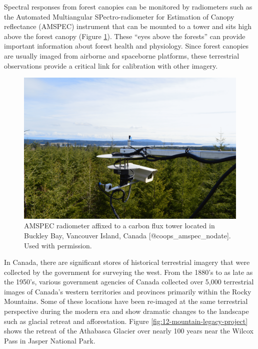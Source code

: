 \documentclass[
]{book}
\begin{document}
Spectral responses from forest canopies can be monitored by radiometers such as the Automated Multiangular SPectro-radiometer for Estimation of Canopy reflectance (AMSPEC) instrument that can be mounted to a tower and sits high above the forest canopy (Figure \ref{fig:12-flux-tower-radiometer}). These ``eyes above the forests'' can provide important information about forest health and physiology. Since forest canopies are usually imaged from airborne and spaceborne platforms, these terrestrial observations provide a critical link for calibration with other imagery.

\begin{figure}
\includegraphics[width=0.9\linewidth]{images/12-flux-tower-radiometer} \caption{AMSPEC radiometer affixed to a carbon flux tower located in Buckley Bay, Vancouver Island, Canada [@coops_amspec_nodate]. Used with permission.}\label{fig:12-flux-tower-radiometer}
\end{figure}

In Canada, there are significant stores of historical terrestrial imagery that were collected by the government for surveying the west. From the 1880's to as late as the 1950's, various government agencies of Canada collected over 5,000 terrestrial images of Canada's western territories and provinces primarily within the Rocky Mountains. Some of these locations have been re-imaged at the same terrestrial perspective during the modern era and show dramatic changes to the landscape such as glacial retreat and afforestation. Figure \ref{fig:12-mountain-legacy-project} shows the retreat of the Athabasca Glacier over nearly 100 years near the Wilcox Pass in Jasper National Park.
\end{document}
